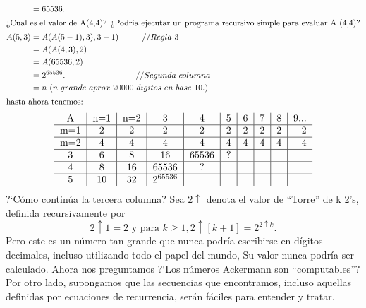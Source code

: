 \begin{align*}
	&=65536.\\
	\intertext{?`Cual es el valor de A(4,4)?  
	?`Podría ejecutar un programa recursivo simple para evaluar A (4,4)?}
	A(5,3) &= A(A(5-1),3),3-1) \hspace*{1cm} // Regla~3\\
	&= A(A(4,3), 2) \hspace*{2cm} \\
	&=A(65536,2)	\hspace*{2,3cm}\\
	&=2^{65536}.\hspace*{3cm}// Segunda~columna\\
	&=n~(n~ grande~aprox~20000~digitos~en~base~10.)\\
	\intertext{hasta ahora tenemos:}
\end{align*}
\begin{equation*}
\begin{tabular}{c|c|c|c|c|c|c|c|c|r}
A & n=1 & n=2 & 3 & 4 & 5 & 6 & 7 & 8 & 9... \\
\hline
m=1 & 2 & 2 & 2 & 2 & 2 & 2 & 2 & 2 & 2 \\
\hline
m=2 & 4 & 4 & 4 & 4 & 4 & 4 & 4 & 4 & 4 \\
\hline
3   & 6 & 8 & 16 & 65536 & ? &  &  &  &  \\
\hline
4   & 8 & 16 & 65536 & ? &  &  &  &  &  \\
\hline
5  & 10 & 32 & $2^{65536}$ &  &  &  &  &  &  \\
\end{tabular}
\end{equation*}
?`Cómo continúa la tercera columna? Sea $2\uparrow$ denota el valor de ``Torre'' de k 2's, definida recursivamente por \[ 2\uparrow 1=2 \text{ y para } k\geq1,2\uparrow[k+1]=2^{2\uparrow k}. \]
Pero este es un número tan grande que nunca podría escribirse en dígitos decimales, incluso utilizando todo el papel del mundo, Su valor nunca podría ser calculado. Ahora nos preguntamos ?`Los números Ackermann son “computables”? Por otro lado, supongamos que las secuencias que encontramos, incluso aquellas definidas por ecuaciones de recurrencia, serán fáciles para entender y tratar.